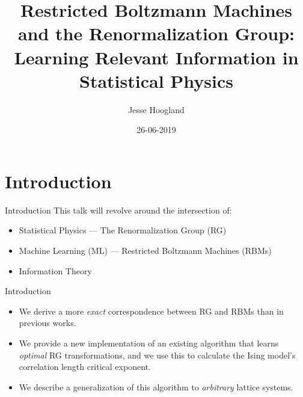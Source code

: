 \documentclass{beamer}
\title[RBMs and RG\@: Learning Relevant Information]{Restricted Boltzmann Machines and the Renormalization Group: Learning Relevant Information in Statistical Physics}
\author{Jesse Hoogland}
\institute{Amsterdam University College}
\date{26-06-2019}
\begin{document}
\begin{frame}
  \titlepage
\end{frame}

\section{Introduction}
\begin{frame}{Introduction}
  This talk will revolve around the intersection of: {\Large
    \begin{itemize}
    \item Statistical Physics --- The Renormalization Group (RG)
    \item Machine Learning (ML) --- Restricted Boltzmann Machines
      (RBMs)
    \item Information Theory
    \end{itemize}
  }
\end{frame}

\begin{frame}{Introduction}
  \begin{itemize}
  \item We derive a more \textit{exact} correspondence between RG and
    RBMs than in previous works.
  \item We provide a new implementation of an existing algorithm that
    learns \textit{optimal} RG transformations, and we use this to
    calculate the Ising model's correlation length critical exponent.
  \item We describe a generalization of this algorithm to
    \textit{arbitrary} lattice systems.
  \end{itemize}
\end{frame}

\end{document}
